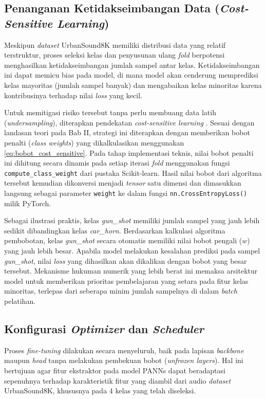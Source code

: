 \subsection{Penanganan Ketidakseimbangan Data (\textit{Cost-Sensitive Learning})}
Meskipun \textit{dataset} UrbanSound8K memiliki distribusi data yang relatif terstruktur, proses seleksi kelas dan penyusunan ulang \textit{fold} berpotensi menghasilkan ketidakseimbangan jumlah sampel antar kelas.
Ketidakseimbangan ini dapat memicu bias pada model, di mana model akan cenderung memprediksi kelas mayoritas (jumlah sampel banyak) dan mengabaikan kelas minoritas karena kontribusinya terhadap nilai \textit{loss} yang kecil. \par

Untuk memitigasi risiko tersebut tanpa perlu membuang data latih (\textit{undersampling}), diterapkan pendekatan \textit{cost-sensitive learning} \cite{elkan2001foundations}.
Sesuai dengan landasan teori pada Bab II, strategi ini diterapkan dengan memberikan bobot penalti (\textit{class weights}) yang dikalkulasikan menggunakan \ref{eq:bobot_cost_sensitive}.
Pada tahap implementasi teknis, nilai bobot penalti ini dihitung secara dinamis pada setiap iterasi \textit{fold} menggunakan fungsi \texttt{compute\_class\_weight} dari pustaka Scikit-learn.
Hasil nilai bobot dari algoritma tersebut kemudian dikonversi menjadi \textit{tensor} satu dimensi dan dimasukkan langsung sebagai parameter \texttt{weight} ke dalam fungsi \texttt{nn.CrossEntropyLoss()} milik PyTorch. \par

Sebagai ilustrasi praktis, kelas \textit{gun\_shot} memiliki jumlah sampel yang jauh lebih sedikit dibandingkan kelas \textit{car\_horn}.
Berdasarkan kalkulasi algoritma pembobotan, kelas \textit{gun\_shot} secara otomatis memiliki nilai bobot pengali ($w$) yang jauh lebih besar.
Apabila model melakukan kesalahan prediksi pada sampel \textit{gun\_shot}, nilai \textit{loss} yang dihasilkan akan dikalikan dengan bobot yang besar tersebut.
Mekanisme hukuman numerik yang lebih berat ini memaksa arsitektur model untuk memberikan prioritas pembelajaran yang setara pada fitur kelas minoritas, terlepas dari seberapa minim jumlah sampelnya di dalam \textit{batch} pelatihan. \par

\subsection{Konfigurasi \textit{Optimizer} dan \textit{Scheduler}}
Proses \textit{fine-tuning} dilakukan secara menyeluruh, baik pada lapisan \textit{backbone} maupun \textit{head} tanpa melakukan pembekuan bobot (\textit{unfrozen layers}).
Hal ini bertujuan agar fitur ekstraktor pada model PANNs dapat beradaptasi sepenuhnya terhadap karakteristik fitur yang diambil dari audio \textit{dataset} UrbanSound8K, khususnya pada 4 kelas yang telah diseleksi. \par


